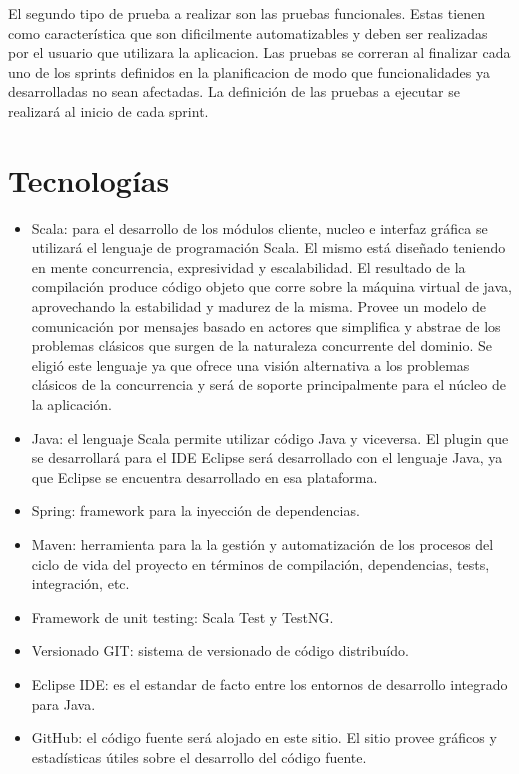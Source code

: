 \documentclass[12pt,a4paper]{article}
\begin{document}
El segundo tipo de prueba a realizar son las pruebas funcionales. Estas tienen como característica que son dificilmente automatizables y deben ser realizadas por el usuario que utilizara la aplicacion. Las pruebas se correran al finalizar cada uno de los sprints definidos en la planificacion de modo que funcionalidades ya desarrolladas no sean afectadas.
La definición de las pruebas a ejecutar se realizará al inicio de cada sprint.	
	
	\section{Tecnologías}
	
	\begin{itemize}
	
	\item Scala: para el desarrollo de los módulos cliente, nucleo e interfaz gráfica se utilizará el lenguaje de programación Scala. El mismo está diseñado teniendo en mente concurrencia, expresividad y escalabilidad. El resultado de la compilación produce código objeto que corre sobre la máquina virtual de java, aprovechando la estabilidad y madurez de la misma. Provee un modelo de comunicación por mensajes basado en actores que simplifica y abstrae de los problemas clásicos que surgen de la naturaleza concurrente del dominio.
Se eligió este lenguaje ya que ofrece una visión alternativa a los problemas clásicos de la concurrencia y será de soporte principalmente para el núcleo de la aplicación.

	\item Java: el lenguaje Scala permite utilizar código Java y viceversa. El plugin que se desarrollará para el IDE Eclipse será desarrollado con el lenguaje Java, ya que Eclipse se encuentra desarrollado en esa plataforma.

	\item Spring: framework para la inyección de dependencias.

	\item Maven: herramienta para la la gestión y automatización de los procesos del ciclo de vida del proyecto en términos de compilación, dependencias, tests, integración, etc.

	\item Framework de unit testing: Scala Test y TestNG.

	\item Versionado GIT: sistema de versionado de código distribuído.

	\item Eclipse IDE: es el estandar de facto entre los entornos de desarrollo integrado para Java.

	\item GitHub: el código fuente será alojado en este sitio. El sitio provee gráficos y estadísticas útiles sobre el desarrollo del código fuente.	

	\end{itemize}
\end{document}
